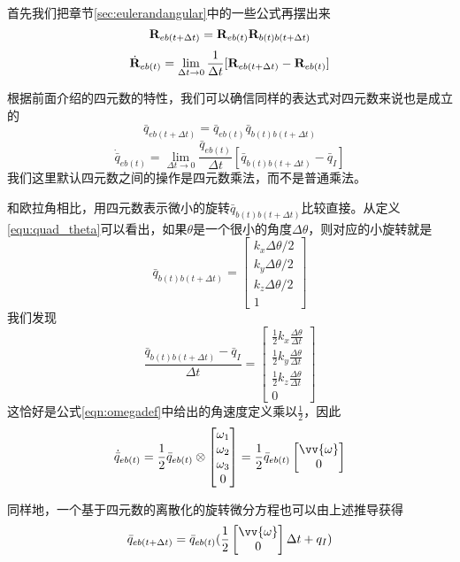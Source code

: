 \documentclass[11pt]{article}
\begin{document}
首先我们把章节\ref{sec:eulerandangular}中的一些公式再摆出来
\begin{equation*}
{\bf R}_{eb(t+\Delta t)} = {\bf R}_{eb(t)}{\bf R}_{b(t)b(t+\Delta t)}
\end{equation*}
$$
\dot{{\bf R}}_{eb(t)} = \lim_{\Delta t \to 0}\frac{1}{\Delta t}[{\bf R}_{eb(t+\Delta t)} - {\bf R}_{eb(t)}]
$$

根据前面介绍的四元数的特性，我们可以确信同样的表达式对四元数来说也是成立的
\begin{equation*}
\bar{q}_{eb(t+\Delta t)} = \bar{q}_{eb(t)}\bar{q}_{b(t)b(t+\Delta t)}
\end{equation*}
$$
\dot{\bar{q}}_{eb(t)} = \lim_{\Delta t \to 0}\frac{\bar{q}_{eb(t)}}{\Delta t}[\bar{q}_{b(t)b(t+\Delta t)} - \bar{q}_I]
$$
我们这里默认四元数之间的操作是四元数乘法，而不是普通乘法。

和欧拉角相比，用四元数表示微小的旋转$\bar{q}_{b(t)b(t+\Delta t)}$比较直接。从定义\ref{equ:quad_theta}可以看出，如果$\theta$是一个很小的角度$\Delta \theta$，则对应的小旋转就是
$$
\bar{q}_{b(t)b(t+\Delta t)} =
	\begin{bmatrix} 
        k_x \Delta\theta/2\\
        k_y \Delta\theta/2\\
        k_z \Delta\theta/2\\
      	1
	\end{bmatrix}
$$
我们发现
$$
\frac{\bar{q}_{b(t)b(t+\Delta t)} - \bar{q}_I}{\Delta t} =
	\begin{bmatrix} 
        \frac{1}{2}k_x \frac{\Delta\theta}{\Delta t}\\
        \frac{1}{2}k_y \frac{\Delta\theta}{\Delta t}\\
        \frac{1}{2}k_z \frac{\Delta\theta}{\Delta t}\\
      	0
	\end{bmatrix}
$$
这恰好是公式\ref{eqn:omegadef}中给出的角速度定义乘以$\frac{1}{2}$，因此
$$
\dot{\bar{q}}_{eb(t)} = \frac{1}{2}\bar{q}_{eb(t)}\otimes
	\begin{bmatrix} 
        \omega_1\\ 
        \omega_2\\ 
        \omega_3\\
      	0
	\end{bmatrix} = 
	\frac{1}{2}\bar{q}_{eb(t)}
	\begin{bmatrix} 
        \vv{\omega}\\
      	0
	\end{bmatrix}
$$

同样地，一个基于四元数的离散化的旋转微分方程也可以由上述推导获得
\begin{equation}\label{eqn:discreterdot_quat}
\bar{q}_{eb(t+\Delta t)} = \bar{q}_{eb(t)}(
	\frac{1}{2}	
	\begin{bmatrix} 
        \vv{\omega}\\
      	0
	\end{bmatrix}\Delta t + q_I
	)
\end{equation}
\end{document}
